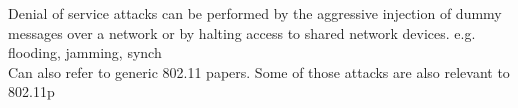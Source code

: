 Denial of service attacks can be performed by the aggressive injection of dummy messages over a network or by halting access to shared network devices. e.g. flooding, jamming, synch \cite{biswas2012ddos}\\

Can also refer to generic 802.11 papers. Some of those attacks are also relevant to 802.11p\\